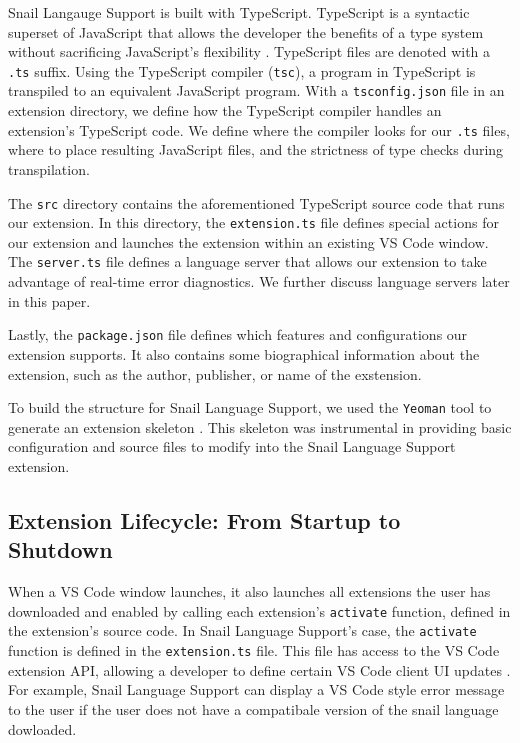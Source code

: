 \documentclass{article}
\begin{document}
Snail Langauge Support is built with TypeScript. TypeScript is a syntactic superset of JavaScript that allows the developer the benefits of a type system without sacrificing JavaScript's flexibility \cite{TypeScript_2023}. TypeScript files are denoted with a \lstinline{.ts} suffix. Using the TypeScript compiler (\lstinline{tsc}), a program in TypeScript is transpiled to an equivalent JavaScript program. With a \lstinline{tsconfig.json} file in an extension directory, we define how the TypeScript compiler handles an extension's TypeScript code. We define where the compiler looks for our \lstinline{.ts} files, where to place resulting JavaScript files, and the strictness of type checks during transpilation.

The \lstinline{src} directory contains the aforementioned TypeScript source code that runs our extension. In this directory, the \lstinline{extension.ts} file defines special actions for our extension and launches the extension within an existing VS Code window. The \lstinline{server.ts} file defines a language server that allows our extension to take advantage of real-time error diagnostics. We further discuss language servers later in this paper. 

Lastly, the \lstinline{package.json} file defines which features and configurations our extension supports. It also contains some biographical information about the extension, such as the author, publisher, or name of the exstension. 

To build the structure for Snail Language Support, we used the \lstinline{Yeoman} tool to generate an extension skeleton \cite{Yeoman_2023}. This skeleton was instrumental in providing basic configuration and source files to modify into the Snail Language Support extension.

\subsection{Extension Lifecycle: From Startup to Shutdown}

When a VS Code window launches, it also launches all extensions the user has downloaded and enabled by calling each extension's \lstinline{activate} function, defined in the extension's source code. In Snail Language Support's case, the \lstinline{activate} function is defined in the \lstinline{extension.ts} file. This file has access to the VS Code extension API, allowing a developer to define certain VS Code client UI updates \cite{Microsoft_2023d}. For example, Snail Language Support can display a VS Code style error message to the user if the user does not have a compatibale version of the snail language dowloaded. 
\end{document}
